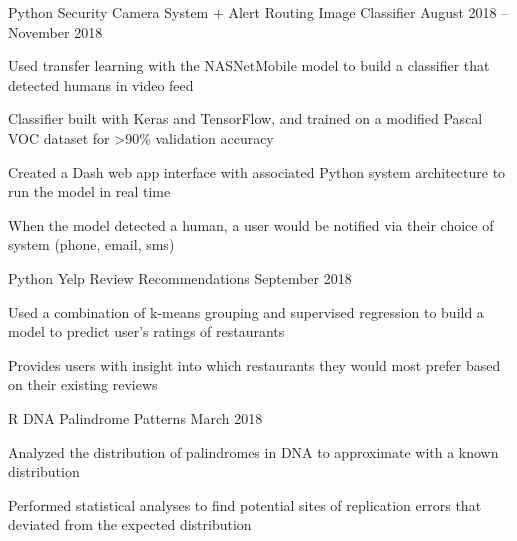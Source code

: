 

\begin{cventries}

  \cventry
    {Python} %
    {Security Camera System + Alert Routing Image Classifier} %
    {} %
    {August 2018 – November 2018} %
    {
      \begin{cvitems} %
        \item {Used transfer learning with the NASNetMobile model to build a classifier that detected humans in video feed}
        \item {Classifier built with Keras and TensorFlow, and trained on a modified Pascal VOC dataset for >90\% validation accuracy}
        \item {Created a Dash web app interface with associated Python system architecture to run the model in real time}
        \item {When the model detected a human, a user would be notified via their choice of system (phone, email, sms)}
      \end{cvitems}
    }

\cventry
    {Python} %
    {Yelp Review Recommendations} %
    {} %
    {September 2018} %
    {
      \begin{cvitems} %
        \item {Used a combination of k-means grouping and supervised regression to build a model to predict user's ratings of restaurants}
        \item {Provides users with insight into which restaurants they would most prefer based on their existing reviews}
      \end{cvitems}
    }

\cventry
    {R} %
    {DNA Palindrome Patterns} %
    {} %
    {March 2018} %
    {
      \begin{cvitems} %
        \item {Analyzed the distribution of palindromes in DNA to approximate with a known distribution}
        \item {Performed statistical analyses to find potential sites of replication errors that deviated from the expected distribution}
      \end{cvitems}
    }

\end{cventries}
